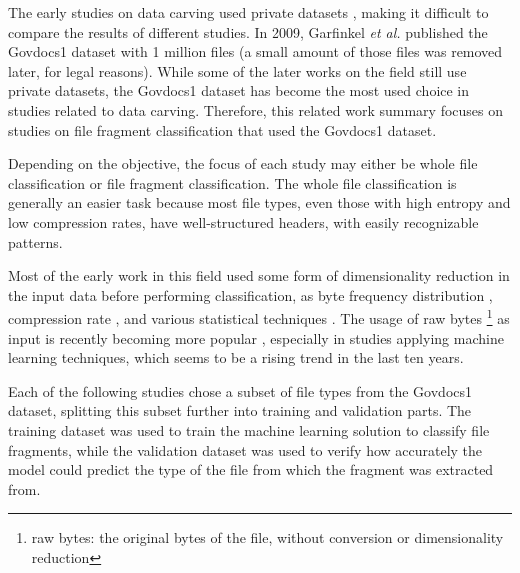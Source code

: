 The early studies on data carving used private datasets
\cite{karresand_file_2006} \cite{veenman_statistical_2007} \cite{erbacher_identification_2007} \cite{moody_sadi-statistical_2008} \cite{calhoun_predicting_2008} \cite{li_novel_2010} \cite{conti_automated_2010} \cite{kattan_gp-fileprints:_2010},
making it difficult to compare the results of different studies. In 2009, Garfinkel \textit{et al.} \cite{garfinkel_bringing_2009} published the Govdocs1 dataset with 1 million files (a small amount of those files was removed later, for legal reasons). While some of the later works on the field still use private datasets, the Govdocs1 dataset has become the most used choice in studies related to data carving. Therefore, this related work summary focuses on studies on file fragment classification that used the Govdocs1 dataset.

Depending on the objective, the focus of each study may either be whole file classification or file fragment classification. The whole file classification is generally an easier task because most file types, even those with high entropy and low compression rates, have well-structured headers, with easily recognizable patterns.

Most of the early work in this field used some form of dimensionality reduction in the input data before performing classification, as byte frequency distribution 
\cite{karresand_oscarfile_2006} \cite{harris_using_2007} \cite{amirani_new_2008} \cite{ahmed_content-based_2010} \cite{ahmed_fast_2010} \cite{sportiello_context-based_2012} \cite{amirani_feature-based_2013} \cite{qiu_new_2014} \cite{maslim_distributed_2014} \cite{ali_classification_2018}, compression rate \cite{axelsson_normalised_2010} \cite{penrose_approaches_2013}, and various statistical techniques \cite{veenman_statistical_2007} \cite{erbacher_identification_2007} \cite{moody_sadi-statistical_2008} \cite{calhoun_predicting_2008} \cite{li_novel_2010} \cite{kattan_gp-fileprints:_2010} \cite{gopal_statistical_2011}. The usage of raw bytes \footnote{raw bytes: the original bytes of the file, without conversion or dimensionality reduction} as input is recently becoming more popular \cite{hiester_file_2018} \cite{chen_file_2018} \cite{wang_sparse_2018} \cite{wang_file_2018} \cite{vulinovic_neural_2019},
especially in studies applying machine learning techniques, which seems to be a rising trend in the last ten years.

Each of the following studies chose a subset of file types from the Govdocs1 dataset, splitting this subset further into training and validation parts. The training dataset was used to train the machine learning solution to classify file fragments, while the validation dataset was used to verify how accurately the model could predict the type of the file from which the fragment was extracted from.

